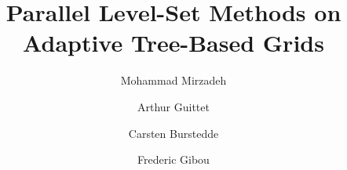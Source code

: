 \documentclass[final]{elsarticle}
\begin{document}
\title{Parallel Level-Set Methods on Adaptive Tree-Based Grids}

\address[MECHE]{Department of Mechanical Engineering, University of California, Santa Barbara, CA 93106-5070, United States.}
\address[CS]{Department of Computer Science, University of California, Santa Barbara, CA 93106-5110, United States.}
\address[UBONN]{Institute for Numerical Simulation, University of Bonn, 53115 Bonn, Germany.}

\author[MECHE]{Mohammad Mirzadeh} \author[MECHE]{Arthur Guittet} \author[UBONN] {Carsten Burstedde} \author[MECHE,CS]{Frederic Gibou}











\end{document}
